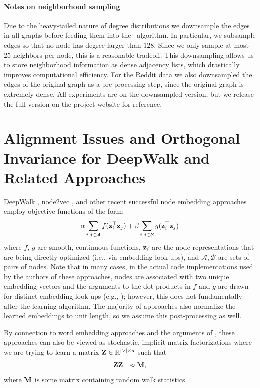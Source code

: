 \paragraph{Notes on neighborhood sampling}
Due to the heavy-tailed nature of degree distributions we downsample the edges in all graphs before feeding them into the \name\ algorithm.
In particular, we subsample edges so that no node has degree larger than $128$. 
Since we only sample at most $25$ neighbors per node, this is a reasonable tradeoff.
This downsampling allows us to store neighborhood information as dense adjacency lists, which drastically improves computational efficiency. 
For the Reddit data we also downsampled the edges of the original graph as a pre-processing step, since the original graph is extremely dense. 
All experiments are on the downsampled version, but we release the full version on the project website for reference. 


\section{Alignment Issues and Orthogonal Invariance for DeepWalk and Related Approaches}\label{sec:rotational}

DeepWalk \cite{perozzi2014deepwalk}, node2vec \cite{grover2016node2vec}, and other recent successful node embedding approaches employ objective functions of the form:
\begin{equation}\label{eq:n2vobj}
\alpha\sum_{i,j \in \mathcal{A}}f(\mathbf{z}_i^\top\mathbf{z}_{j}) + \beta\sum_{i,j \in \mathcal{B}}g(\mathbf{z}_i^\top\mathbf{z}_{j}) 
\end{equation}
where $f$, $g$ are smooth, continuous functions, $\mathbf{z}_i$ are the node representations that are being directly optimized (i.e., via embedding look-ups), and $\mathcal{A}, \mathcal{B}$ are sets of pairs of nodes. 
Note that in many cases, in the actual code implementations used by the authors of these approaches, nodes are associated with two unique embedding vectors and the arguments to the dot products in $f$ and $g$ are drawn for distinct embedding look-ups (e.g., \cite{grover2016node2vec,perozzi2014deepwalk}); however, this does not fundamentally alter the learning algorithm. 
The majority of approaches also normalize the learned embeddings to unit length, so we assume this post-processing as well.

By connection to word embedding approaches and the arguments of \cite{levy2014neural}, these approaches can also be viewed as stochastic, implicit matrix factorizations where we are trying to learn a matrix $\mathbf{Z} \in \mathbb{R}^{|\mathcal{V}| \times d}$ such that
\begin{equation}
\mathbf{Z}\mathbf{Z}^\top \approx \mathbf{M},
\end{equation}
where $\mathbf{M}$ is some matrix containing random walk statistics. 

